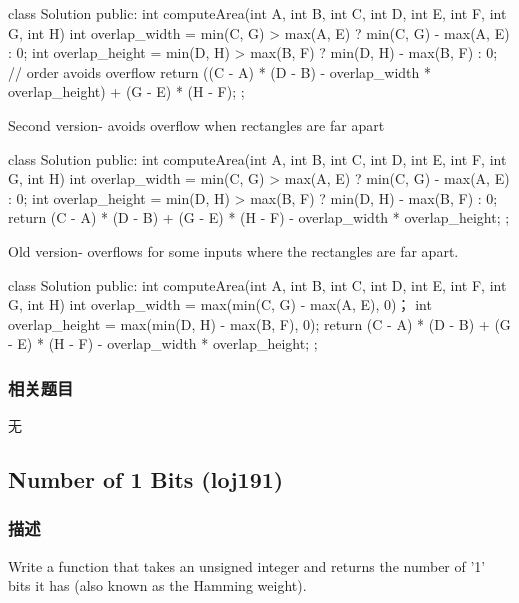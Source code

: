 \begin{Code}
class Solution {
    public:
    int computeArea(int A, int B, int C, int D, int E, int F, int G, int H) {
        int overlap_width = min(C, G) > max(A, E) ? min(C, G) - max(A, E) : 0; 
        int overlap_height = min(D, H) > max(B, F) ? min(D, H) - max(B, F) : 0;
        // order avoids overflow
        return ((C - A) * (D - B) - overlap_width * overlap_height) + (G - E) * (H - F); 
    }
};
\end{Code}

Second version- avoids overflow when rectangles are far apart

\begin{Code}
class Solution {
    public:
    int computeArea(int A, int B, int C, int D, int E, int F, int G, int H) {
        int overlap_width = min(C, G) > max(A, E) ? min(C, G) - max(A, E) : 0; 
        int overlap_height = min(D, H) > max(B, F) ? min(D, H) - max(B, F) : 0;
        return (C - A) * (D - B) + (G - E) * (H - F) - overlap_width * overlap_height;
    }
};
\end{Code}

Old version- overflows for some inputs where the rectangles are far apart.

\begin{Code}
class Solution {
    public:
    int computeArea(int A, int B, int C, int D, int E, int F, int G, int H) {
        int overlap_width = max(min(C, G) - max(A, E), 0)；
        int overlap_height = max(min(D, H) - max(B, F), 0);
        return (C - A) * (D - B) + (G - E) * (H - F) - overlap_width * overlap_height;
    }
};
\end{Code}

\subsubsection{相关题目}
\begindot
\item 无
\myenddot

\subsection{Number of 1 Bits (loj191)}
\label{sec:number-of-1-bits}

\subsubsection{描述}

Write a function that takes an unsigned integer and returns the number of ’1' bits it has (also known as the Hamming weight).

